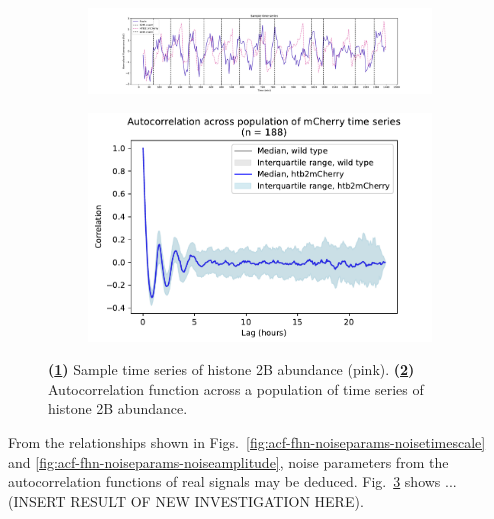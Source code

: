 \begin{figure}
  \centering
  \begin{subfigure}[t]{0.6\textwidth}
  \centering
    \includegraphics[width=\linewidth]{htb2mCherry_26643_plots_purple_01.pdf}
    \caption{
    }
    \label{fig:acf-fhn-biol-ts}
  \end{subfigure}%
  \begin{subfigure}[t]{0.4\textwidth}
  \centering
    \includegraphics[width=\linewidth]{htb2mCherry_26643_plots_mCh_06.png}
    \caption{
    }
    \label{fig:acf-fhn-biol-acf}
  \end{subfigure}

  \caption{
    \textbf{(\ref{fig:acf-fhn-biol-ts})}
    Sample time series of histone 2B abundance (pink).
    \textbf{(\ref{fig:acf-fhn-biol-acf})}
    Autocorrelation function across a population of time series of histone 2B abundance.
  }
  \label{fig:acf-fhn-biol}
\end{figure}

From the relationships shown in Figs.\ \ref{fig:acf-fhn-noiseparams-noisetimescale} and \ref{fig:acf-fhn-noiseparams-noiseamplitude}, noise parameters from the autocorrelation functions of real signals may be deduced.
Fig.\ \ref{fig:acf-fhn-biol} shows ...(INSERT RESULT OF NEW INVESTIGATION HERE).


